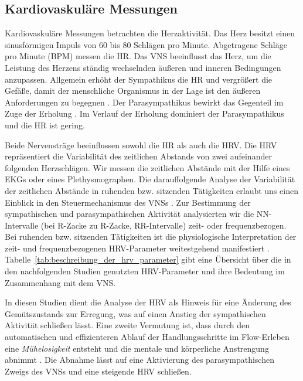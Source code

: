 
\subsection{Kardiovaskuläre Messungen} %
\label{sub:kardiovaskulare_messungen}

Kardiovaskuläre Messungen betrachten die Herzaktivität. Das Herz besitzt einen sinusförmigen Impuls von 60 bis 80 Schlägen pro Minute. Abgetragene Schläge pro Minute (\ac{BPM}) messen die \ac{HR}. Das \ac{VNS} beeinflusst das Herz, um die Leistung des Herzens ständig wechselnden äußeren und inneren Bedingungen anzupassen. Allgemein erhöht der Sympathikus die \ac{HR} und vergrößert die Gefäße, damit der menschliche Organismus in der Lage ist den äußeren Anforderungen zu begegnen \citep[][S.~226]{Porges1995}. Der Parasympathikus bewirkt das Gegenteil im Zuge der Erholung \citep[][S.~226]{Porges1995}. Im Verlauf der Erholung dominiert der Parasympathikus und die \ac{HR} ist gering. 

Beide Nervensträge beeinflussen sowohl die \ac{HR} als auch die \ac{HRV}. Die \ac{HRV} repräsentiert die Variabilität des zeitlichen Abstands von zwei aufeinander folgenden Herzschlägen. Wir messen die zeitlichen Abstände mit der Hilfe eines \ac{EKG}s oder eines Plethysmographen. Die darauffolgende Analyse der Variabilität der zeitlichen Abstände in ruhenden bzw. sitzenden Tätigkeiten erlaubt uns einen Einblick in den Steuermechanismus des \ac{VNS}s \citep[][]{Jalife1983}. Zur Bestimmung der sympathischen und parasympathischen Aktivität analysierten wir die NN-Intervalle (bei R-Zacke zu R-Zacke, RR-Intervalle) zeit- oder frequenzbezogen. Bei ruhenden bzw. sitzenden Tätigkeiten ist die physiologische Interpretation der zeit- und frequenzbezogenen \ac{HRV}-Parameter weitestgehend manifestiert \citep[][S.~360]{TaskForce1996}. Tabelle~\ref{tab:beschreibung_der_hrv_parameter} gibt eine Übersicht über die in den nachfolgenden Studien genutzten \ac{HRV}-Parameter und ihre Bedeutung im Zusammenhang mit dem \ac{VNS}. 

In diesen Studien dient die Analyse der \ac{HRV} als Hinweis für eine Änderung des Gemütszustands zur Erregung, was auf einen Anstieg der sympathischen Aktivität schließen lässt. Eine zweite Vermutung ist, dass durch den automatischen und effizienteren Ablauf der Handlungsschritte im Flow-Erleben eine \emph{Mühelosigkeit} entsteht und die mentale und körperliche Anstrengung abnimmt \citep[vgl.][S.~308]{deManzano2010}. Die Abnahme lässt auf eine Aktivierung des parasympathischen Zweigs des \ac{VNS}s und eine steigende \ac{HRV} schließen. 

